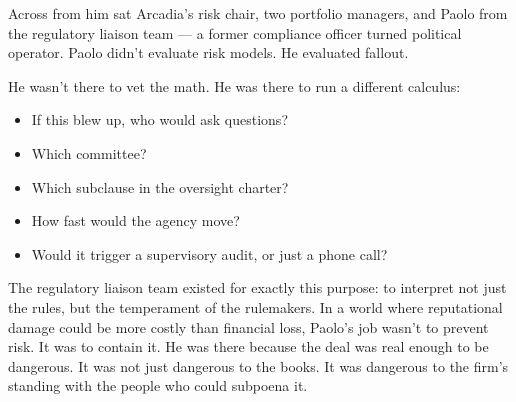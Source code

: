 Across from him sat Arcadia’s risk chair, two portfolio managers, and Paolo from the regulatory liaison team 
— a former compliance officer turned political operator. Paolo didn’t evaluate risk models. 
He evaluated fallout.

He wasn’t there to vet the math. He was there to run a different calculus:

\begin{itemize}
  \item If this blew up, who would ask questions?
  \item Which committee?
  \item Which subclause in the oversight charter?
  \item How fast would the agency move?
  \item Would it trigger a supervisory audit, or just a phone call?
\end{itemize}

The regulatory liaison team existed for exactly this purpose: to interpret not just the rules, but the temperament of the 
rulemakers.
In a world where reputational damage could be more costly than financial loss, Paolo’s job wasn’t to prevent risk. It was to 
contain it.
He was there because the deal was real enough to be dangerous. It was not just dangerous to the books. 
It was dangerous to the firm’s standing with the people who could subpoena it.

\medskip

